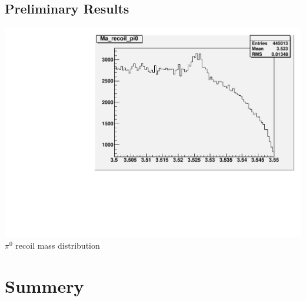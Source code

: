 \documentclass{beamer}
\begin{document}
\subsection{Preliminary Results}
\begin{frame}
\begin{center}
\includegraphics[width=0.8\textheight,angle=0]{figures/Pi0_recoil.pdf}\\
$\pi^0$ recoil mass distribution
\end{center}
\end{frame}

\section{Summery}
\end{document}
